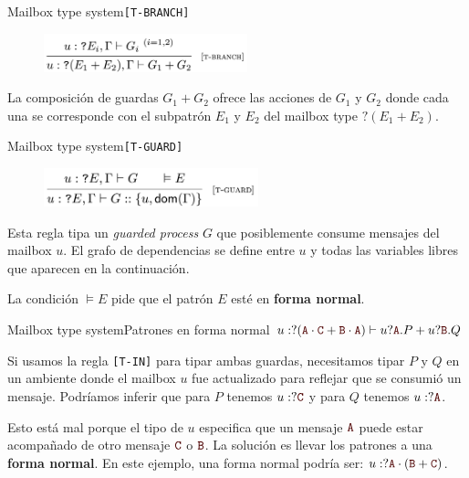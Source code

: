 \documentclass{beamer}
\newcommand{\msgtag}[1]{\texttt{\textcolor{msg-color}{#1}}}
\begin{document}
\begin{frame}{Mailbox type system}{\texttt{[T-BRANCH]}}
    \begin{figure}[H]
        \includegraphics[height=3em]{typing-rules-t-branch}
    \end{figure}

    La composición de guardas $G_1 + G_2$ ofrece las acciones de $G_1$ y $G_2$ donde cada una se corresponde con el subpatrón $E_1$ y $E_2$ del mailbox type $?(E_1 + E_2)$.
\end{frame}

\begin{frame}{Mailbox type system}{\texttt{[T-GUARD]}}
    \begin{figure}[H]
        \includegraphics[height=3em]{typing-rules-t-guard}
    \end{figure}

    Esta regla tipa un \emph{guarded process} $G$ que posiblemente consume mensajes del mailbox $u$. El grafo de dependencias se define entre $u$ y todas las variables libres que aparecen en la continuación.
    \vspace{1em}

    La condición $\models E$ pide que el patrón $E$ esté en \textbf{forma normal}.
\end{frame}

\begin{frame}{Mailbox type system}{Patrones en forma normal}
    $u:?(\msgtag{A} \cdot \msgtag{C} + \msgtag{B} \cdot \msgtag{A}) \vdash u? \msgtag{A}.P + u? \msgtag{B}.Q$
    \vspace{1em}

    Si usamos la regla \texttt{[T-IN]} para tipar ambas guardas, necesitamos tipar $P$ y $Q$ en un ambiente donde el mailbox $u$ fue actualizado para reflejar que se consumió un mensaje. Podríamos inferir que para $P$ tenemos $u:?\msgtag{C}$ y para $Q$ tenemos $u:?\msgtag{A}$.
    \vspace{1em}

    Esto está mal porque el tipo de $u$ especifica que un mensaje $\msgtag{A}$ puede estar acompañado de otro mensaje $\msgtag{C}$ o $\msgtag{B}$. La solución es llevar los patrones a una \textbf{forma normal}. En este ejemplo, una forma normal podría ser: $u:?\msgtag{A} \cdot (\msgtag{B} + \msgtag{C})$.
\end{frame}
\end{document}
